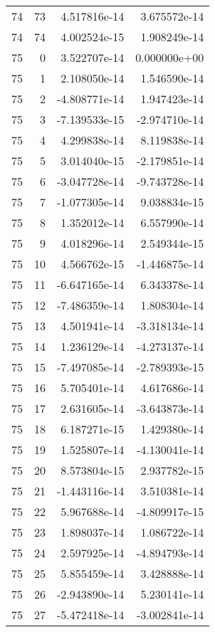 \begin{tabular}{rrrr}
  74 &   73 &  4.517816e-14 &  3.675572e-14 \\
  74 &   74 &  4.002524e-15 &  1.908249e-14 \\
  75 &    0 &  3.522707e-14 &  0.000000e+00 \\
  75 &    1 &  2.108050e-14 &  1.546590e-14 \\
  75 &    2 & -4.808771e-14 &  1.947423e-14 \\
  75 &    3 & -7.139533e-15 & -2.974710e-14 \\
  75 &    4 &  4.299838e-14 &  8.119838e-14 \\
  75 &    5 &  3.014040e-15 & -2.179851e-14 \\
  75 &    6 & -3.047728e-14 & -9.743728e-14 \\
  75 &    7 & -1.077305e-14 &  9.038834e-15 \\
  75 &    8 &  1.352012e-14 &  6.557990e-14 \\
  75 &    9 &  4.018296e-14 &  2.549344e-15 \\
  75 &   10 &  4.566762e-15 & -1.446875e-14 \\
  75 &   11 & -6.647165e-14 &  6.343378e-14 \\
  75 &   12 & -7.486359e-14 &  1.808304e-14 \\
  75 &   13 &  4.501941e-14 & -3.318134e-14 \\
  75 &   14 &  1.236129e-14 & -4.273137e-14 \\
  75 &   15 & -7.497085e-14 & -2.789393e-15 \\
  75 &   16 &  5.705401e-14 &  4.617686e-14 \\
  75 &   17 &  2.631605e-14 & -3.643873e-14 \\
  75 &   18 &  6.187271e-15 &  1.429380e-14 \\
  75 &   19 &  1.525807e-14 & -4.130041e-14 \\
  75 &   20 &  8.573804e-15 &  2.937782e-15 \\
  75 &   21 & -1.443116e-14 &  3.510381e-14 \\
  75 &   22 &  5.967688e-14 & -4.809917e-15 \\
  75 &   23 &  1.898037e-14 &  1.086722e-14 \\
  75 &   24 &  2.597925e-14 & -4.894793e-14 \\
  75 &   25 &  5.855459e-14 &  3.428888e-14 \\
  75 &   26 & -2.943890e-14 &  5.230141e-14 \\
  75 &   27 & -5.472418e-14 & -3.002841e-14 \\

\end{tabular}
